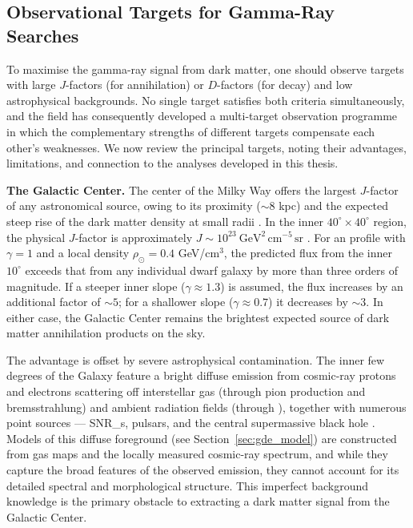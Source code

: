 \subsection{Observational Targets for Gamma-Ray Searches}
\label{sec:targets}

To maximise the gamma-ray signal from dark matter, one should observe targets with large $J$-factors (for annihilation) or $D$-factors (for decay) and low astrophysical backgrounds.
No single target satisfies both criteria simultaneously, and the field has consequently developed a multi-target observation programme in which the complementary strengths of different targets compensate each other's weaknesses.
We now review the principal targets, noting their advantages, limitations, and connection to the analyses developed in this thesis.

\textbf{The Galactic Center.}
The center of the Milky Way offers the largest $J$-factor of any astronomical source, owing to its proximity ($\sim 8$ kpc) and the expected steep rise of the dark matter density at small radii \cite{Hooper:2024}. In the inner $40^\circ \times 40^\circ$ region, the physical $J$-factor is approximately $J \sim 10^{23}~\mathrm{GeV}^2\,\mathrm{cm}^{-5}\,\mathrm{sr}$ \cite{Chang_2018}.
For an \NFW profile with $\gamma = 1$ and a local density $\rho_\odot = 0.4$ GeV/cm$^3$, the predicted flux from the inner $10^\circ$ exceeds that from any individual dwarf galaxy by more than three orders of magnitude.
If a steeper inner slope ($\gamma \approx 1.3$) is assumed, the flux increases by an additional factor of $\sim 5$; for a shallower slope ($\gamma \approx 0.7$) it decreases by $\sim 3$.
In either case, the Galactic Center remains the brightest expected source of dark matter annihilation products on the sky.

The advantage is offset by severe astrophysical contamination.
The inner few degrees of the Galaxy feature a bright diffuse emission from cosmic-ray protons and electrons scattering off interstellar gas (through pion production and bremsstrahlung) and ambient radiation fields (through \ICS), together with numerous point sources --- \glspl{SNR_}, pulsars, and the central supermassive black hole \cite{Hooper:2024}.
Models of this diffuse foreground (see Section~\ref{sec:gde_model}) are constructed from gas maps and the locally measured cosmic-ray spectrum, and while they capture the broad features of the observed emission, they cannot account for its detailed spectral and morphological structure.
This imperfect background knowledge is the primary obstacle to extracting a dark matter signal from the Galactic Center.

